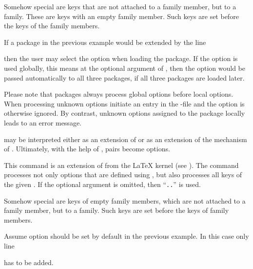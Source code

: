 Somehow special are keys that are not attached to a family member, but to a
family. These are keys with an empty family member. Such keys are set before
the keys of the family members.
\begin{Example}
  If a package in the previous example would be extended by the line
\begin{lstcode}
\end{lstcode}
  then the user may select the option  when loading the
  package. If the option is used globally, this means at the optional
  argument of , then the option would be passed
  automatically to all three packages, if all three packages are loaded
  later.
\end{Example}
Please note that packages always process global options
before local options. When processing unknown options initiate an entry in the
-file and the option is otherwise ignored. By contrast, unknown
options assigned to the package locally leads to an error message.

 may be interpreted either as an extension of
 or as an extension of the  mechanism
of . Ultimately, with the help of
,  pairs become options.%
%
%


\begin{Declaration}
\end{Declaration}
%
This command is an extension of  from the \LaTeX{}
kernel (see \cite{latex:clsguide}). The command processes not only options
that are defined using , but also processes all keys of
the given . If the optional argument  is omitted, then
``\texttt{.}\texttt{.}'' is used.

Somehow special are keys of empty family members, which are not attached to a
family member, but to a family. Such keys are set before the keys of family
members.
\begin{Example}
  Assume option  should be set by default in the
  previous example. In this case only line
\begin{lstcode}
\end{lstcode}
  has to be added.
\end{Example}
%
%


